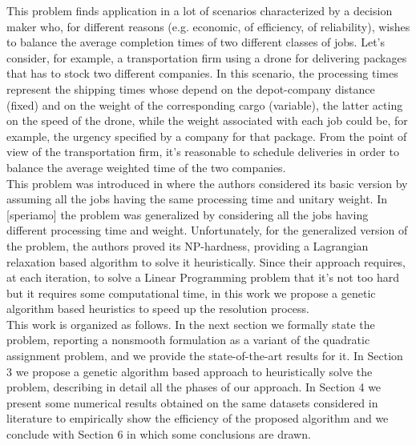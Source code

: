 \documentclass[opre,nonblindrev]{informs3} %
\begin{document}
This problem finds application in a lot of scenarios characterized by a decision maker who, for different reasons (e.g. economic, of efficiency, of reliability), wishes to balance the average completion times of two different classes of jobs. Let’s consider, for example, a transportation firm using a drone for delivering packages that has to stock two different companies. In this scenario, the processing times represent the shipping times whose depend on the depot-company distance (fixed) and on the weight of the corresponding cargo (variable), the latter acting on the speed of the drone, while the weight associated with each job could be, for example, the urgency specified by a company for that package. From the point of view of the transportation firm, it’s reasonable to schedule deliveries in order to balance the average weighted time of the two companies. \\
This problem was introduced in \cite{av-fud20} where the authors considered its basic version by assuming all the jobs having the same processing time and unitary weight. In [speriamo] the problem was generalized by considering all the jobs having different processing time and weight. Unfortunately, for the generalized version of the problem, the authors proved its NP-hardness, providing a Lagrangian relaxation based algorithm to solve it heuristically. Since their approach requires, at each iteration, to solve a Linear Programming problem that it's not too hard but it requires some computational time, in this work we propose a genetic algorithm based heuristics to speed up the resolution process.\\
This work is organized as follows. In the next section we formally state the problem, reporting a nonsmooth formulation as a variant of the quadratic assignment problem, and we provide the state-of-the-art results for it. In Section 3 we propose a genetic algorithm based approach to heuristically solve the problem, describing in detail all the phases of our approach. In Section 4 we present some numerical results obtained on the same datasets considered in literature to empirically show the efficiency of the proposed algorithm and we conclude with Section 6 in which some conclusions are drawn.
\end{document}
